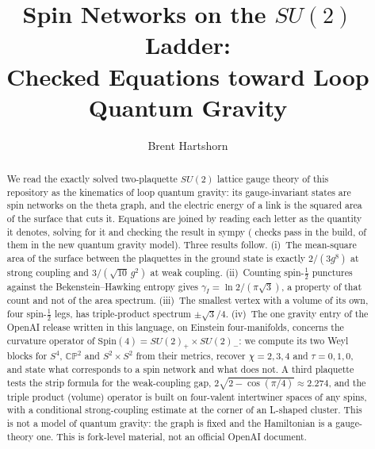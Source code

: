 \documentclass[10pt]{article}
\title{Spin Networks on the $SU(2)$ Ladder:\\ Checked Equations toward Loop Quantum Gravity}
\author{Brent Hartshorn \orcidlink{0009-0004-2853-655X}}
\date{}
\begin{document}
\maketitle

\begin{abstract}
\noindent
We read the exactly solved two-plaquette $SU(2)$ lattice gauge theory of this repository as the kinematics of loop quantum
gravity: its gauge-invariant states are spin networks on the theta graph, and the electric energy of a link is the squared
area of the surface that cuts it. Equations are joined by reading each letter as the quantity it denotes, solving for it
and checking the result in sympy (\nChecks{} checks pass in the build, \nQgChecks{} of them in the new quantum gravity model).
Three results follow. (i)~The mean-square area of the surface between the plaquettes in the ground state is exactly
$2/(3g^8)$ at strong coupling and $3/(\sqrt{10}\,g^2)$ at weak coupling. (ii)~Counting spin-$\tfrac12$ punctures against the
Bekenstein--Hawking entropy gives $\gamma_I=\ln2/(\pi\sqrt3)$, a property of that count and not of the area spectrum.
(iii)~The smallest vertex with a volume of its own, four spin-$\tfrac12$ legs, has triple-product spectrum $\pm\sqrt3/4$.
(iv)~The one gravity entry of the OpenAI release written in this language, on Einstein four-manifolds, concerns the curvature
operator of $\mathrm{Spin}(4)=SU(2)_+\times SU(2)_-$: we compute its two Weyl blocks for $S^4$, $\mathbb{CP}^2$ and $S^2\times S^2$ from
their metrics, recover $\chi=2,3,4$ and $\tau=0,1,0$, and state what corresponds to a spin network and what does not.
A third plaquette tests the strip formula for the weak-coupling gap, $2\sqrt{2-\cos(\pi/4)}\approx2.274$, and the triple product (volume) operator is built on
four-valent intertwiner spaces of any spins, with a conditional strong-coupling estimate at the corner of an L-shaped cluster.
This is not a model of quantum gravity: the graph is fixed and the Hamiltonian is a gauge-theory one. This is fork-level
material, not an official OpenAI document.
\end{abstract}




\end{document}
